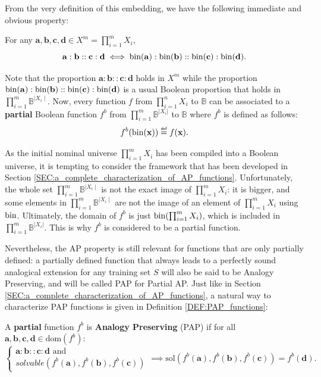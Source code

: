 From the very definition of this embedding, we have the following immediate and
obvious property:
\begin{property}
  \label{PROPER:analogy_nominal_iff_analogy_bin}
  For any $\mathbf{a}, \mathbf{b}, \mathbf{c}, \mathbf{d} \in X^m =
  \prod_{i=1}^m X_i$,
$$\mathbf{a}: \mathbf{b}:: \mathbf{c}: \mathbf{d} \iff
 \text{bin}(\mathbf{a}): \text{bin}(\mathbf{b}):: \text{bin}(\mathbf{c}):
  \text{bin}(\mathbf{d}).$$
 \end{property}
 \noindent
 Note that the proportion $\mathbf{a}: \mathbf{b}:: \mathbf{c}: \mathbf{d}$
 holds in $X^m$ while the proportion $\text{bin}(\mathbf{a}): \text{bin}(\mathbf{b})::
 \text{bin}(\mathbf{c}): \text{bin}(\mathbf{d})$ is a usual Boolean proportion that holds
 in $\prod_{i=1}^m\mathbb{B}^{\mid X_i \mid}$.  Now, every function $f$ from
 $\prod_{i=1}^n X_i$ to $\mathbb{B}$ can be associated to a \textbf{partial}
 Boolean function $f^b$ from $\prod_{i=1}^m \mathbb{B}^{|X_i|}$ to $\mathbb{B}$
 where $f^b$ is defined as follows:
$$
f^b(\bin(\mathbf{x})) \eqdef f(\mathbf{x}).
$$

As the initial nominal universe  $\prod_{i=1}^m X_i$  has been compiled into a
Boolean universe, it is tempting to consider the framework that has been
developed in Section \ref{SEC:a_complete_characterization_of_AP_functions}.
Unfortunately, the whole set $\prod_{i=1}^m \mathbb{B}^{\mid X_i\mid}$ is not
the exact image of $\prod_{i=1}^m X_i$: it is bigger, and some elements in
$\prod_{i=1}^m  \mathbb{B}^{\mid X_i\mid}$ are not the image of an element of
$\prod_{i=1}^m X_i$ using $\text{bin}$.  Ultimately, the domain of $f^b$ is just
$\text{bin}(\prod_{i=1}^m X_i)$, which is included in $\prod_{i=1}^m
\mathbb{B}^{|X_i|}$. This is why $f^b$ is considered to be a partial function.

Nevertheless, the AP property is still relevant for functions that are only
partially defined: a partially defined function that always leads to a perfectly
sound analogical extension for any training set $S$ will also be said to be
Analogy Preserving, and will be called PAP for Partial AP. Just like in Section
\ref{SEC:a_complete_characterization_of_AP_functions}, a natural way to
characterize PAP functions is given in Definition \ref{DEF:PAP_functions}:

\begin{definition}
  \label{DEF:PAP_functions}
  A \textbf{partial} function $f^b$ is {\bf Analogy Preserving} (PAP)
  if for all $\mathbf{a}, \mathbf{b}, \mathbf{c}, \mathbf{d} \in
  \text{dom}(f^b)$:
  $$
  \begin{cases}
    \mathbf{a} :  \mathbf{b} ::  \mathbf{c} :  \mathbf{d} \text{ and }\\
    solvable(f^b(\mathbf{a}),f^b(\mathbf{b}),f^b(\mathbf{c}))
  \end{cases}
  \implies \text{sol}(f^b(\mathbf{a}),f^b(\mathbf{b}),f^b(\mathbf{c})) =
  f^b(\mathbf{d}).
  $$
\end{definition}

